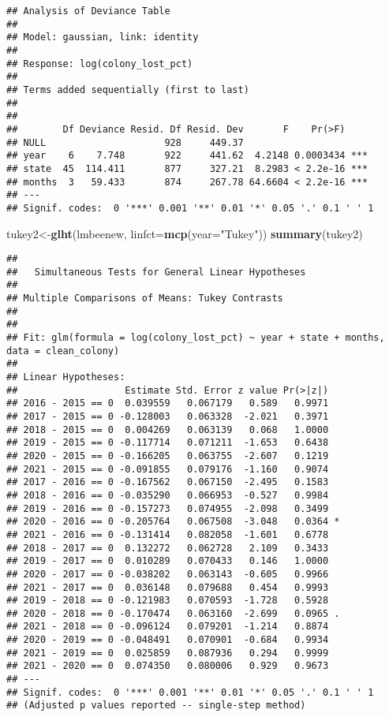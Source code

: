 \documentclass[
]{article}
\newenvironment{Shaded}{\begin{snugshade}}{\end{snugshade}}
\newcommand{\AttributeTok}[1]{\textcolor[rgb]{0.13,0.29,0.53}{#1}}
\newcommand{\FunctionTok}[1]{\textcolor[rgb]{0.13,0.29,0.53}{\textbf{#1}}}
\newcommand{\NormalTok}[1]{#1}
\newcommand{\OtherTok}[1]{\textcolor[rgb]{0.56,0.35,0.01}{#1}}
\newcommand{\StringTok}[1]{\textcolor[rgb]{0.31,0.60,0.02}{#1}}
\begin{document}
\begin{verbatim}
## Analysis of Deviance Table
## 
## Model: gaussian, link: identity
## 
## Response: log(colony_lost_pct)
## 
## Terms added sequentially (first to last)
## 
## 
##        Df Deviance Resid. Df Resid. Dev       F    Pr(>F)    
## NULL                     928     449.37                      
## year    6    7.748       922     441.62  4.2148 0.0003434 ***
## state  45  114.411       877     327.21  8.2983 < 2.2e-16 ***
## months  3   59.433       874     267.78 64.6604 < 2.2e-16 ***
## ---
## Signif. codes:  0 '***' 0.001 '**' 0.01 '*' 0.05 '.' 0.1 ' ' 1
\end{verbatim}

\begin{Shaded}
\begin{Highlighting}[]
\NormalTok{tukey2}\OtherTok{\textless{}{-}}\FunctionTok{glht}\NormalTok{(lmbeenew, }\AttributeTok{linfct=}\FunctionTok{mcp}\NormalTok{(}\AttributeTok{year=}\StringTok{"Tukey"}\NormalTok{))}
\FunctionTok{summary}\NormalTok{(tukey2)}
\end{Highlighting}
\end{Shaded}

\begin{verbatim}
## 
##   Simultaneous Tests for General Linear Hypotheses
## 
## Multiple Comparisons of Means: Tukey Contrasts
## 
## 
## Fit: glm(formula = log(colony_lost_pct) ~ year + state + months, data = clean_colony)
## 
## Linear Hypotheses:
##                   Estimate Std. Error z value Pr(>|z|)  
## 2016 - 2015 == 0  0.039559   0.067179   0.589   0.9971  
## 2017 - 2015 == 0 -0.128003   0.063328  -2.021   0.3971  
## 2018 - 2015 == 0  0.004269   0.063139   0.068   1.0000  
## 2019 - 2015 == 0 -0.117714   0.071211  -1.653   0.6438  
## 2020 - 2015 == 0 -0.166205   0.063755  -2.607   0.1219  
## 2021 - 2015 == 0 -0.091855   0.079176  -1.160   0.9074  
## 2017 - 2016 == 0 -0.167562   0.067150  -2.495   0.1583  
## 2018 - 2016 == 0 -0.035290   0.066953  -0.527   0.9984  
## 2019 - 2016 == 0 -0.157273   0.074955  -2.098   0.3499  
## 2020 - 2016 == 0 -0.205764   0.067508  -3.048   0.0364 *
## 2021 - 2016 == 0 -0.131414   0.082058  -1.601   0.6778  
## 2018 - 2017 == 0  0.132272   0.062728   2.109   0.3433  
## 2019 - 2017 == 0  0.010289   0.070433   0.146   1.0000  
## 2020 - 2017 == 0 -0.038202   0.063143  -0.605   0.9966  
## 2021 - 2017 == 0  0.036148   0.079688   0.454   0.9993  
## 2019 - 2018 == 0 -0.121983   0.070593  -1.728   0.5928  
## 2020 - 2018 == 0 -0.170474   0.063160  -2.699   0.0965 .
## 2021 - 2018 == 0 -0.096124   0.079201  -1.214   0.8874  
## 2020 - 2019 == 0 -0.048491   0.070901  -0.684   0.9934  
## 2021 - 2019 == 0  0.025859   0.087936   0.294   0.9999  
## 2021 - 2020 == 0  0.074350   0.080006   0.929   0.9673  
## ---
## Signif. codes:  0 '***' 0.001 '**' 0.01 '*' 0.05 '.' 0.1 ' ' 1
## (Adjusted p values reported -- single-step method)
\end{verbatim}
\end{document}
